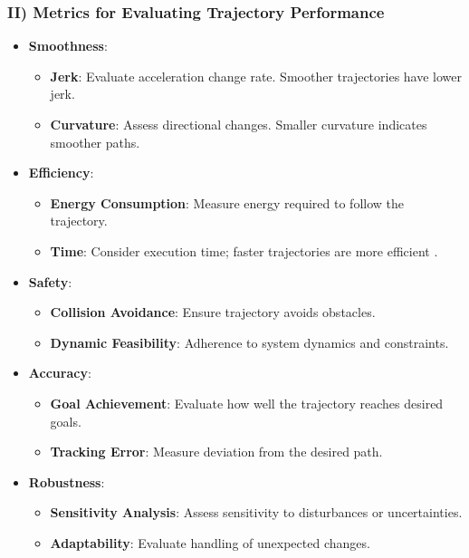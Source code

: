 \documentclass[conference]{IEEEtran}
\begin{document}
\subsubsection*{II) Metrics for Evaluating Trajectory Performance}
\begin{itemize}
    \item \textbf{Smoothness}:
          \begin{itemize}
              \item \textbf{Jerk}: Evaluate acceleration change rate. Smoother trajectories have lower jerk.
              \item \textbf{Curvature}: Assess directional changes. Smaller curvature indicates smoother paths.
          \end{itemize}

    \item \textbf{Efficiency}:
          \begin{itemize}
              \item \textbf{Energy Consumption}: Measure energy required to follow the trajectory.
              \item \textbf{Time}: Consider execution time; faster trajectories are more efficient \cite{b6}.
          \end{itemize}

    \item \textbf{Safety}:
          \begin{itemize}
              \item \textbf{Collision Avoidance}: Ensure trajectory avoids obstacles.
              \item \textbf{Dynamic Feasibility}: Adherence to system dynamics and constraints.
          \end{itemize}

    \item \textbf{Accuracy}:
          \begin{itemize}
              \item \textbf{Goal Achievement}: Evaluate how well the trajectory reaches desired goals.
              \item \textbf{Tracking Error}: Measure deviation from the desired path.
          \end{itemize}

    \item \textbf{Robustness}:
          \begin{itemize}
              \item \textbf{Sensitivity Analysis}: Assess sensitivity to disturbances or uncertainties.
              \item \textbf{Adaptability}: Evaluate handling of unexpected changes.
          \end{itemize}
\end{itemize}
\end{document}

